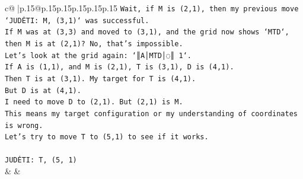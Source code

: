 \documentclass{article}
\begin{document}
{\begin{supertabular}{c@{$\;$}|p{.15\linewidth}@{}p{.15\linewidth}p{.15\linewidth}p{.15\linewidth}p{.15\linewidth}p{.15\linewidth}}
{{{\texttt{Wait, if M is (2,1), then my previous move `JUDĖTI: M, (3,1)` was successful.} \\
\texttt{If M was at (3,3) and moved to (3,1), and the grid now shows `MTD`, then M is at (2,1)? No, that's impossible.} \\
\texttt{Let's look at the grid again: `║A│MTD│◌║ 1`.} \\
\texttt{If A is (1,1), and M is (2,1), T is (3,1), D is (4,1).} \\
\texttt{Then T is at (3,1). My target for T is (4,1).} \\
\texttt{But D is at (4,1).} \\
\texttt{I need to move D to (2,1). But (2,1) is M.} \\
\texttt{This means my target configuration or my understanding of coordinates is wrong.} \\
\texttt{Let's try to move T to (5,1) to see if it works.} \\
\\ 
\texttt{JUDĖTI: T, (5, 1)} \\
            }
        }
    }
    & & \\ \\


\end{supertabular}}
\end{document}
